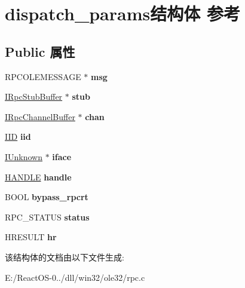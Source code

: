 \hypertarget{structdispatch__params}{}\section{dispatch\+\_\+params结构体 参考}
\label{structdispatch__params}
\subsection*{Public 属性}
\begin{DoxyCompactItemize}
\item 
\mbox{\label{structdispatch__params_afb221d75d6c5bb3590ec18ab0cdce403}} 
R\+P\+C\+O\+L\+E\+M\+E\+S\+S\+A\+GE $\ast$ {\bfseries msg}
\item 
\mbox{\label{structdispatch__params_a360fa4f9d01ddc43ce99422adfaf73b9}} 
\hyperlink{interface_i_rpc_stub_buffer}{I\+Rpc\+Stub\+Buffer} $\ast$ {\bfseries stub}
\item 
\mbox{\label{structdispatch__params_ae1ebcdcf0812cf44dbefc1da3ff61625}} 
\hyperlink{interface_i_rpc_channel_buffer}{I\+Rpc\+Channel\+Buffer} $\ast$ {\bfseries chan}
\item 
\mbox{\label{structdispatch__params_a90dcc2401f84222c8db5b5b3b9bc1775}} 
\hyperlink{struct___i_i_d}{I\+ID} {\bfseries iid}
\item 
\mbox{\label{structdispatch__params_aba19b45f1e95853de2c5a27804fd9586}} 
\hyperlink{interface_i_unknown}{I\+Unknown} $\ast$ {\bfseries iface}
\item 
\mbox{\label{structdispatch__params_ac7c9c89f7b977c74c09d508b90603d8b}} 
\hyperlink{interfacevoid}{H\+A\+N\+D\+LE} {\bfseries handle}
\item 
\mbox{\label{structdispatch__params_a55e6afc7cedd64c3ae886fbee899c54f}} 
B\+O\+OL {\bfseries bypass\+\_\+rpcrt}
\item 
\mbox{\label{structdispatch__params_ac4ac9027be23b691962db233d7b96c38}} 
R\+P\+C\+\_\+\+S\+T\+A\+T\+US {\bfseries status}
\item 
\mbox{\label{structdispatch__params_aa0730299f80c2f181c6bcc714fd0c46f}} 
H\+R\+E\+S\+U\+LT {\bfseries hr}
\end{DoxyCompactItemize}


该结构体的文档由以下文件生成\+:\begin{DoxyCompactItemize}
\item 
E\+:/\+React\+O\+S-\/0../dll/win32/ole32/rpc.\+c\end{DoxyCompactItemize}
